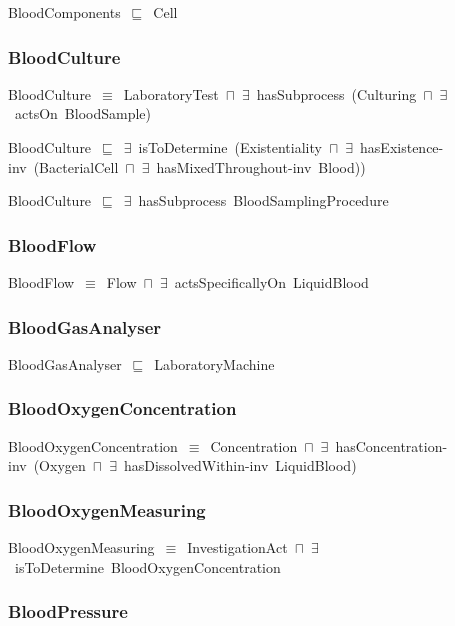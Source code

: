 \documentclass{article}
\begin{document}
BloodComponents~\ensuremath{\sqsubseteq}~Cell~

\subsubsection*{BloodCulture}

BloodCulture~\ensuremath{\equiv}~LaboratoryTest~\ensuremath{\sqcap}~\ensuremath{\exists}~hasSubprocess~(Culturing~\ensuremath{\sqcap}~\ensuremath{\exists}~actsOn~BloodSample)

BloodCulture~\ensuremath{\sqsubseteq}~\ensuremath{\exists}~isToDetermine~(Existentiality~\ensuremath{\sqcap}~\ensuremath{\exists}~hasExistence-inv~(BacterialCell~\ensuremath{\sqcap}~\ensuremath{\exists}~hasMixedThroughout-inv~Blood))~

BloodCulture~\ensuremath{\sqsubseteq}~\ensuremath{\exists}~hasSubprocess~BloodSamplingProcedure~

\subsubsection*{BloodFlow}

BloodFlow~\ensuremath{\equiv}~Flow~\ensuremath{\sqcap}~\ensuremath{\exists}~actsSpecificallyOn~LiquidBlood

\subsubsection*{BloodGasAnalyser}

BloodGasAnalyser~\ensuremath{\sqsubseteq}~LaboratoryMachine~

\subsubsection*{BloodOxygenConcentration}

BloodOxygenConcentration~\ensuremath{\equiv}~Concentration~\ensuremath{\sqcap}~\ensuremath{\exists}~hasConcentration-inv~(Oxygen~\ensuremath{\sqcap}~\ensuremath{\exists}~hasDissolvedWithin-inv~LiquidBlood)

\subsubsection*{BloodOxygenMeasuring}

BloodOxygenMeasuring~\ensuremath{\equiv}~InvestigationAct~\ensuremath{\sqcap}~\ensuremath{\exists}~isToDetermine~BloodOxygenConcentration

\subsubsection*{BloodPressure}
\end{document}
